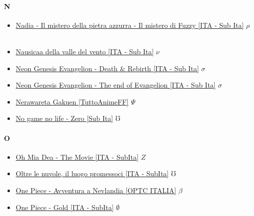 		\paragraph{N} \hypertarget{FN}{}
			\begin{itemize}
			
				\item \href{https://mega.nz/#!1JwliBxC!O4d35kTzJG0uVtkwP4zQlb6iWimCzV93HcZGx4tBWZU} {Nadia - Il mistero della pietra azzurra - Il mistero di Fuzzy [ITA - Sub Ita]} $\rho$   \
				\item \href{https://mega.nz/#!OlMGjTzS!-uNCbIeyzCj6cZqx6AZcUwsS4uC_qdeY5wAmRdVvox4} {Nausicaa della valle del vento [ITA - Sub Ita]} $\nu$   \\
				\item \href{https://mega.nz/#!JYt3QYpC!FQuoWiYAV0tZoOiG75Xe-W8mBWXzRSiurACTMPoNEeI} {Neon Genesis Evangelion - Death \& Rebirth [ITA - Sub Ita]} $\sigma$   \\
				\item \href{https://mega.nz/#!BQtwRKwI!kYOnmL0lz2tfDu7U0-gJeKZRO9p7kVxftejzFwVawog} {Neon Genesis Evangelion - The end of Evangelion [ITA - Sub Ita]} $\sigma$   \\
				\item \href{https://mega.nz/#!FD5EzTqa!Cs_yy3sOCjWR1p3qpLhQvRRgaF_1dPyywbz7jNxJEDg} {Nerawareta Gakuen [TuttoAnimeFF]} $\Psi$ \\ 
				\item \href{https://mega.nz/#!SyBjDJYJ!hS-0ZNhxSETpkP_-ZjpDrafF3LiZ3-ueB7Rya940jDw} {No game no life - Zero [Sub Ita]} $\mho$   \\
				
			\end{itemize}	
			
		\paragraph{O} \hypertarget{FO}{}
			\begin{itemize}
				
				\item \href{https://mega.nz/#!VZwBUbYA!dRGaqoWy0KIx6G3oPM5SjcQZCP86dA3aI0i_ikUiCx4} {Oh Mia Dea - The Movie [ITA - SubIta]} $Z$   \\  
				\item \href{https://mega.nz/#!z2RAFZra!M0GIWIg9eVFewACWcPN5tzuCUiHDPRk0yAR8gN0gCcc} {Oltre le nuvole, il luogo promessoci [ITA - SubIta]} $\mho$   \\ 
				\item \href{https://mega.nz/#!Dh5jgaKD!zvQfPUhz6wLpGKGxBcvnI1jmgC_adf12uqR6kbNSn5Q} {One Piece - Avventura a Nevlandia [OPTC ITALIA]} $\beta$   \\  
				\item \href{https://mega.nz/#!QL4EUSga!RAmWMqnn3oh-M3XGDbsiYpvCEIL8WpHl96EI-OI7kQM} {One Piece - Gold [ITA - SubIta]} $\emptyset$   \\  
			
			\end{itemize}
		
